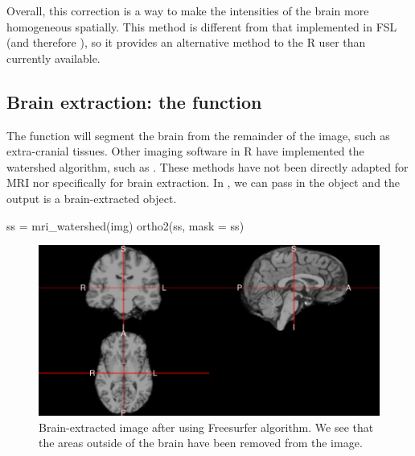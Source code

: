 Overall, this correction is a way to make the intensities of the brain
more homogeneous spatially. This method is different from that
implemented in FSL \citep{jenkinson_fsl_2012} (and therefore
), so it provides an alternative method to the R user than
currently available.

\subsection{\texorpdfstring{Brain extraction: the 
function}{Brain extraction: the  function}}\label{brain-extraction-the-function}

The  function will segment the brain from the
remainder of the image, such as extra-cranial tissues. Other imaging
software in R have implemented the watershed algorithm, such as
 \citep{EBImage}. These methods have not been directly
adapted for MRI nor specifically for brain extraction. In
, we can pass in the  object and the output
is a brain-extracted  object.

\begin{Schunk}
\begin{Sinput}
ss = mri_watershed(img)
ortho2(ss, mask = ss)
\end{Sinput}
\end{Schunk}

\begin{Schunk}
\begin{figure}
\includegraphics{Freesurfer_files/figure-latex/watershed_plot-1} \caption[Brain-extracted image after using Freesurfer  algorithm]{Brain-extracted image after using Freesurfer  algorithm.  We see that the areas outside of the brain have been removed from the image.}\label{fig:watershed_plot}
\end{figure}
\end{Schunk}

